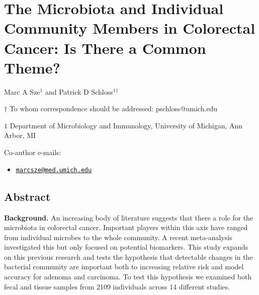 \documentclass[12pt,]{article}
\title{}
\author{}
\date{}
\providecommand{\tightlist}{%
  \setlength{\itemsep}{0pt}\setlength{\parskip}{0pt}}
\begin{document}
\section{The Microbiota and Individual Community Members in Colorectal
Cancer: Is There a Common
Theme?}\label{the-microbiota-and-individual-community-members-in-colorectal-cancer-is-there-a-common-theme}

\begin{center}
\vspace{25mm}

Marc A Sze${^1}$ and Patrick D Schloss${^1}$${^\dagger}$

\vspace{20mm}

$\dagger$ To whom correspondence should be addressed: pschloss@umich.edu

$1$ Department of Microbiology and Immunology, University of Michigan, Ann Arbor, MI




\end{center}

Co-author e-mails:

\begin{itemize}
\tightlist
\item
  \href{mailto:marcsze@med.umich.edu}{\nolinkurl{marcsze@med.umich.edu}}
\end{itemize}

\newpage

\linenumbers

\subsection{Abstract}\label{abstract}

\textbf{Background.} An increasing body of literature suggests that
there a role for the microbiota in colorectal cancer. Important players
within this axis have ranged from individual microbes to the whole
community. A recent meta-analysis investigated this but only focused on
potential biomarkers. This study expands on this previous research and
tests the hypothesis that detectable changes in the bacterial community
are important both to increasing relative risk and model accuracy for
adenoma and carcinoma. To test this hypothesis we examined both fecal
and tissue samples from 2109 individuals across 14 different studies.
\end{document}
